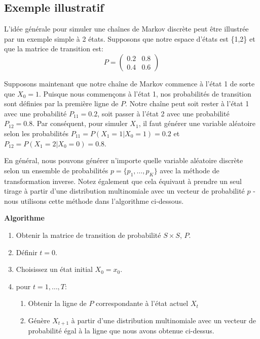 \documentclass[
]{book}
\providecommand{\tightlist}{%
  \setlength{\itemsep}{0pt}\setlength{\parskip}{0pt}}
\theoremstyle{definition}
\theoremstyle{definition}
\theoremstyle{definition}
\theoremstyle{remark}
\begin{document}
\hypertarget{exemple-illustratif}{%
\subsection{Exemple illustratif}\label{exemple-illustratif}}

L'idée générale pour simuler une chaînes de Markov discrète peut être illustrée par un exemple simple à 2 états. Supposons que notre espace d'états est \{1,2\} et que la matrice de transition est:
\[ P=\left(
\begin{array}{cc}
0.2 & 0.8 \\
0.4 & 0.6
\end{array}
\right)\]

Supposons maintenant que notre chaîne de Markov commence à l'état 1 de sorte que \(X_0 = 1\). Puisque nous commençons à l'état 1, nos probabilités de transition sont définies par la première ligne de \(P\). Notre chaîne peut soit rester à l'état 1 avec une probabilité \(P_{11}=0.2\), soit passer à l'état 2 avec une probabilité \(P_{12}=0.8\). Par conséquent, pour simuler \(X_1\), il faut générer une variable aléatoire selon les probabilités \(P_{11} = P (X_1 = 1 | X_0 = 1) = 0.2\) et \(P_{12} = P (X_1 = 2 | X_0 = 0) = 0.8\).

En général, nous pouvons générer n'importe quelle variable aléatoire discrète selon un ensemble de probabilités \(p = \{p_1,\ldots, p_K\}\) avec la méthode de transformation inverse. Notez également que cela équivaut à prendre un seul tirage à partir d'une distribution multinomiale avec un vecteur de probabilité \(p\) - nous utilisons cette méthode dans l'algorithme ci-dessous.

\textbf{Algorithme}

\begin{enumerate}
\def\labelenumi{\arabic{enumi}.}
\tightlist
\item
  Obtenir la matrice de transition de probabilité \(S\times S\), \(P\).
\item
  Définir \(t=0\).
\item
  Choisissez un état initial \(X_0 = x_0\).
\item
  pour \(t=1, \ldots , T\):

  \begin{enumerate}
  \def\labelenumii{\alph{enumii})}
  \tightlist
  \item
    Obtenir la ligne de \(P\) correspondante à l'état actuel \(X_t\)
  \item
    Génère \(X_{t + 1}\) à partir d'une distribution multinomiale avec un vecteur de probabilité égal à la ligne que nous avons obtenue ci-dessus.
  \end{enumerate}
\end{enumerate}
\end{document}
